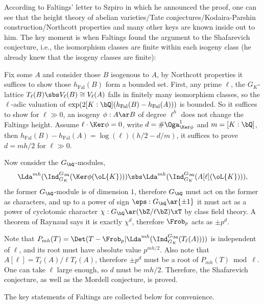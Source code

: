 \documentclass[a4paper, twoside]{article}
\begin{document}
\begin{ups}
	According to Faltings' letter\cite{Paris1985} to Szpiro in which he announced the proof, one can see that the height theory of abelian varieties/Tate conjectures/Kodaira-Parshin construction/Northcott properties and many other keys are known inside out to him. The key moment is when Faltings found the argument to the Shafarevich conjecture, i.e., the isomorphism classes are finite within each isogeny class (he already knew that the isogeny classes are finite):
	\begin{itm}
		\item Fix some $A$ and consider those $B$ isogenous to $A$, by Northcott properties it suffices to show those $h_{\text{Fal}}(B)$ form a bounded set. First, any prime $\ell$, the $G_{K}$-lattice $T_{\ell}(B)\sbs V_{\ell}(B)\cong V_{\ell}(A)$ falls in finitely many isomorphism classes, so the $\ell$-adic valuation of $\exp(2[K:\bQ](h_{\text{Fal}}(B)-h_{\text{Fal}}(A)))$ is bounded. So it suffices to show for $\ell\gg0$, an isogeny $\phi:A\ar B$ of degree $\ell^{h}$ does not change the Faltings height. Assume $\ell\cdot\Ker\phi=0$, write $d=\#\Oga_{\Ker\phi}^{1}$ and $m=[K:\bQ]$, then $h_{\text{Fal}}(B)-h_{\text{Fal}}(A)=\log(\ell)(h/2-d/m)$, it suffices to prove $d=mh/2$ for $\ell\gg0$.
		\item Now consider the $G_{\bQ}$-modules,
		\[
			\Lda^{mh}(\Ind_{G_{K}}^{G_{\bQ}}(\Ker\phi(\oL{K})))\sbs\Lda^{mh}(\Ind_{G_{K}}^{G_{\bQ}}(A[\ell](\oL{K}))),
		\]
		the former $G_{\bQ}$-module is of dimension $1$, therefore $G_{\bQ}$ must act on the former as characters, and up to a power of sign $\eps:G_{\bQ}\ar\{\pm1\}$ it must act as a power of cyclotomic character $\chi:G_{\bQ}\ar(\bZ/\ell\bZ)\xT$ by class field theory. A theorem of Raynaud\cite[4.1.1]{Raynaud1974} says it is exactly $\chi^{d}$, therefore $\Frob_{p}$ acts as $\pm p^{d}$.
		\item Note that $P_{mh}(T)=\Det(T-\Frob_{p}|\Lda^{mh}(\Ind_{G_{K}}^{G_{\bQ}}(T_{\ell}(A))))$ is independent of $\ell$, and its root must have absolute value $p^{mh/2}$.
	Also note that $A[\ell]=T_{\ell}(A)/\ell T_{\ell}(A)$, therefore $\pm p^{d}$ must be a root of $P_{mh}(T)\bmod \ell$. One can take $\ell$ large enough, so $d$ must be $mh/2$. Therefore, the Shafarevich conjecture, as well as the Mordell conjecture, is proved.
	\end{itm}

	The key statements of Faltings are collected below for convenience.
\end{ups}
\end{document}
